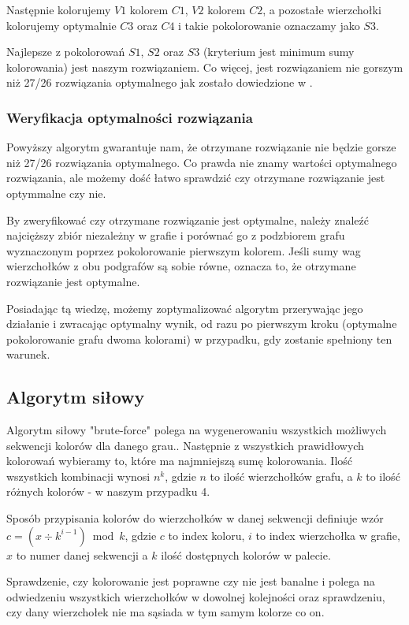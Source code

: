 \documentclass{article}
\begin{document}
Następnie kolorujemy $V1$ kolorem $C1$, $V2$ kolorem $C2$, a pozostałe wierzchołki kolorujemy optymalnie $C3$ oraz $C4$ i takie pokolorowanie oznaczamy jako $S3$.

Najlepsze z pokolorowań $S1$, $S2$ oraz $S3$ (kryterium jest minimum sumy kolorowania) jest naszym rozwiązaniem. Co więcej, jest rozwiązaniem nie gorszym niż 27/26 rozwiązania optymalnego jak zostało dowiedzione w \cite{kubale-pikies19}.

\subsubsection*{Weryfikacja optymalności rozwiązania}

Powyższy algorytm gwarantuje nam, że otrzymane rozwiązanie nie będzie gorsze niż 27/26 rozwiązania optymalnego. Co prawda nie znamy wartości optymalnego rozwiązania, ale możemy dość łatwo sprawdzić czy otrzymane rozwiązanie jest optymmalne czy nie.

By zweryfikować czy otrzymane rozwiązanie jest optymalne, należy znaleźć najcięższy zbiór niezależny w grafie i porównać go z podzbiorem grafu wyznaczonym poprzez pokolorowanie pierwszym kolorem. Jeśli sumy wag wierzchołków z obu podgrafów są sobie równe, oznacza to, że otrzymane rozwiązanie jest optymalne.

Posiadając tą wiedzę, możemy zoptymalizować algorytm przerywając jego działanie i zwracając optymalny wynik, od razu po pierwszym kroku (optymalne pokolorowanie grafu dwoma kolorami) w przypadku, gdy zostanie spełniony ten warunek.

\subsection{Algorytm siłowy}

Algorytm siłowy "brute-force" polega na wygenerowaniu wszystkich możliwych sekwencji kolorów dla danego grau.. Następnie z wszystkich prawidłowych kolorowań wybieramy to, które ma najmniejszą sumę kolorowania. Ilość wszystkich kombinacji wynosi $n^k$, gdzie $n$ to ilość wierzchołków grafu, a $k$ to ilość różnych kolorów - w naszym przypadku 4.

Sposób przypisania kolorów do wierzchołków w danej sekwencji definiuje wzór $c = (x \div k^{i-1}) \bmod k$, gdzie $c$ to index koloru, $i$ to index wierzchołka w grafie, $x$ to numer danej sekwencji a $k$ ilość dostępnych kolorów w palecie. 

Sprawdzenie, czy kolorowanie jest poprawne czy nie jest banalne i polega na odwiedzeniu wszystkich wierzchołków w dowolnej kolejności oraz sprawdzeniu, czy dany wierzchołek nie ma sąsiada w tym samym kolorze co on. 
\end{document}
